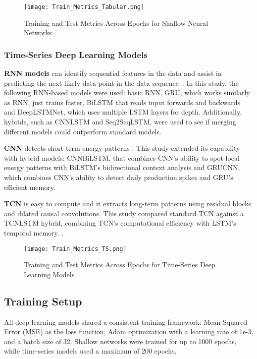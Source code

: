 \documentclass[12pt]{article}
\begin{document}
\begin{figure}[H]
    \centering
    \texttt{[image: Train\_Metrics\_Tabular.png]}
    \caption{Training and Test Metrics Across Epochs for Shallow Neural Networks}
    \label{fig:net_metrics}
\end{figure}

\subsubsection{Time-Series Deep Learning Models}
\label{sec:ts}
\textbf{RNN models} can identify sequential features in the data and assist in predicting the next likely data point in the data sequence~\cite{das2023rnn}. In this study, the following RNN-based models were used: basic RNN, GRU, which works similarly as RNN, just trains faster, BiLSTM that reads input forwards and backwards and DeepLSTMNet, which uses multiple LSTM layers for depth. Additionally, hybrids, such as CNNLSTM and Seq2SeqLSTM, were used to see if merging different models could outperform standard models.
    
\textbf{CNN} detects short-term energy patterns  \cite{brownlee2020cnn}. This study extended its capability with hybrid models: CNNBiLSTM, that combines CNN's ability to spot local energy patterns with BiLSTM's bidirectional context analysis and GRUCNN, which combines CNN's ability to detect daily production spikes and GRU's efficient memory.

\textbf{TCN} is easy to compute and it extracts long-term patterns using residual blocks and dilated causal convolutions. This study compared standard TCN against a TCNLSTM hybrid, combining TCN's computational efficiency with LSTM's temporal memory. \cite{lara2020tcn}.
    

\begin{figure}[H]
    \centering
    \texttt{[image: Train\_Metrics\_TS.png]}
    \caption{Training and Test Metrics Across Epochs for Time-Series Deep Learning Models}
    \label{fig:ts_dl_metrics}
\end{figure}


\subsection{Training Setup}
\label{sec:train}
All deep learning models shared a consistent training framework: Mean Squared Error (MSE) as the loss function, Adam optimization with a learning rate of 1e-3, and a batch size of 32. Shallow networks were trained for up to 1000 epochs, while time-series models used a maximum of 200 epochs.
\end{document}
